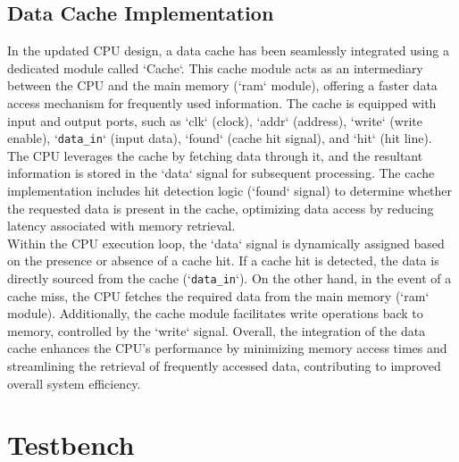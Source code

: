 \documentclass[12pt]{article}
\begin{document}
\subsection{Data Cache Implementation}
In the updated CPU design, a data cache has been seamlessly integrated using a dedicated module called `Cache`. This cache module acts as an intermediary between the CPU and the main memory (`ram` module), offering a faster data access mechanism for frequently used information. The cache is equipped with input and output ports, such as `clk` (clock), `addr` (address), `write` (write enable), `\verb|data_in|` (input data), `found` (cache hit signal), and `hit` (hit line). The CPU leverages the cache by fetching data through it, and the resultant information is stored in the `data` signal for subsequent processing. The cache implementation includes hit detection logic (`found` signal) to determine whether the requested data is present in the cache, optimizing data access by reducing latency associated with memory retrieval.\\

Within the CPU execution loop, the `data` signal is dynamically assigned based on the presence or absence of a cache hit. If a cache hit is detected, the data is directly sourced from the cache (`\verb|data_in|`). On the other hand, in the event of a cache miss, the CPU fetches the required data from the main memory (`ram` module). Additionally, the cache module facilitates write operations back to memory, controlled by the `write` signal. Overall, the integration of the data cache enhances the CPU's performance by minimizing memory access times and streamlining the retrieval of frequently accessed data, contributing to improved overall system efficiency.


\newpage
\section{Testbench}
\end{document}
